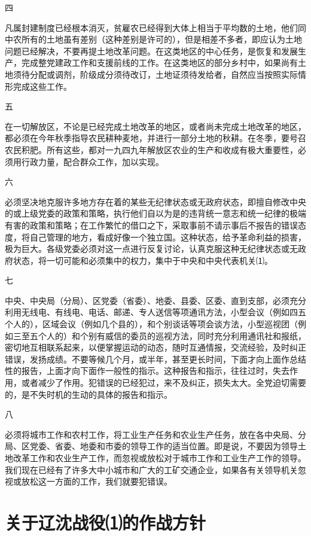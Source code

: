 \documentclass[UTF-8, a5paper, 12pt]{ctexart}
\begin{document}
四

凡属封建制度已经根本消灭，贫雇农已经得到大体上相当于平均数的土地，他们同中农所有的土地虽有差别（这种差别是许可的），但是相差不多者，即应认为土地问题已经解决，不要再提土地改革问题。在这类地区的中心任务，是恢复和发展生产，完成整党建政工作和支援前线的工作。在这类地区的部分乡村中，如果尚有土地须待分配或调剂，阶级成分须待改订，土地证须待发给者，自然应当按照实际情形完成这些工作。

五

在一切解放区，不论是已经完成土地改革的地区，或者尚未完成土地改革的地区，都必须在今年秋季指导农民耕种麦地，并进行一部分土地的秋耕。在冬季，要号召农民积肥。所有这些，都对一九四九年解放区农业的生产和收成有极大重要性，必须用行政力量，配合群众工作，加以实现。

六

必须坚决地克服许多地方存在着的某些无纪律状态或无政府状态，即擅自修改中央的或上级党委的政策和策略，执行他们自以为是的违背统一意志和统一纪律的极端有害的政策和策略；在工作繁忙的借口之下，采取事前不请示事后不报告的错误态度，将自己管理的地方，看成好像一个独立国。这种状态，给予革命利益的损害，极为巨大。各级党委必须对这一点进行反复讨论，认真克服这种无纪律状态或无政府状态，将一切可能和必须集中的权力，集中于中央和中央代表机关⑴。

七

中央、中央局（分局）、区党委（省委）、地委、县委、区委、直到支部，必须充分利用无线电、有线电、电话、邮递、专人送信等项通讯方法，小型会议（例如四五个人的），区域会议（例如几个县的），和个别谈话等项会谈方法，小型巡视团（例如三至五个人的）和个别有威信的委员的巡视方法，同时充分利用通讯社和报纸，密切地互相联系起来，以便掌握运动的动态，随时互通情报，交流经验，及时纠正错误，发扬成绩。不要等候几个月，或半年，甚至更长时间，下面才向上面作总结性的报告，上面才向下面作一般性的指示。这种报告和指示，往往过时，失去作用，或者减少了作用。犯错误的已经犯过，来不及纠正，损失太大。全党迫切需要的，是不失时机的生动的具体的报告和指示。

八

必须将城市工作和农村工作，将工业生产任务和农业生产任务，放在各中央局、分局、区党委、省委、地委和市委的领导工作的适当位置。即是说，不要因为领导土地改革工作和农业生产工作，而忽视或放松对于城市工作和工业生产工作的领导。我们现在已经有了许多大中小城市和广大的工矿交通企业，如果各有关领导机关忽视或放松这一方面的工作，我们就要犯错误。

\section{关于辽沈战役⑴的作战方针}
\end{document}
